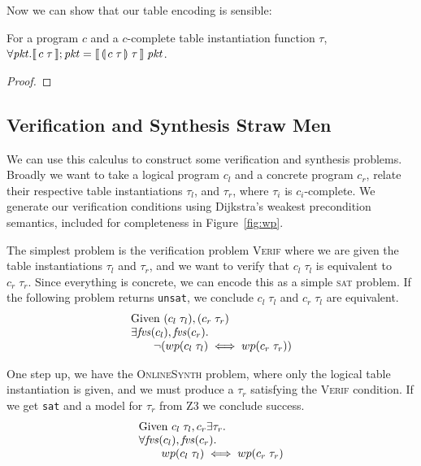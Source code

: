 Now we can show that our table encoding is sensible:

\begin{proposition}
  For a program $c$ and a $c$-complete table instantiation function $\tau$,
  $\forall \mathit{pkt}. \llbracket\,c\; \tau\,\rrbracket;\mathit{pkt} = \llbracket\,\llparenthesis\, c\; \tau\, \rrparenthesis\; \tau\,\rrbracket\; \mathit{pkt}$.
\end{proposition}

\begin{proof}
\end{proof}


\subsection{Verification and Synthesis Straw Men}

We can use this calculus to construct some verification and synthesis
problems. Broadly we want to take a logical program $c_l$ and a concrete program
$c_r$, relate their respective table instantiations $\tau_l$, and $\tau_r$,
where $\tau_i$ is $c_i$-complete.  We generate our verification conditions using
Dijkstra's weakest precondition semantics, included for completeness in
Figure~\ref{fig:wp}.

The simplest problem is the verification problem \textsc{Verif} where we are
given the table instantiations $\tau_l$ and $\tau_r$, and we want to verify that
$c_l\; \tau_l$ is equivalent to $c_r\; \tau_r$. Since everything is concrete, we
can encode this as a simple \textsc{sat} problem. If the following problem
returns \texttt{unsat}, we conclude $c_l\; \tau_l$ and $c_r\; \tau_l$ are
equivalent.
\[\begin{array}{lcl}
    \text{Given }( c_l\; \tau_l), (c_r\; \tau_r) \\
    \exists \mathit{fvs}(c_l), \mathit{fvs}(c_r). \\
    \qquad \neg(wp(c_l\; \tau_l) \iff wp(c_r\; \tau_r))
  \end{array}
\]

One step up, we have the \textsc{OnlineSynth} problem, where only the logical
table instantiation is given, and we must produce a $\tau_r$ satisfying the
\textsc{Verif} condition. If we get \texttt{sat} and a model for $\tau_r$ from
Z3 we conclude success.
\[\begin{array}{lcl}
    \text{Given } c_l\; \tau_l,c_r
    \exists \tau_r.\\
    \forall \mathit{fvs}(c_l), \mathit{fvs}(c_r). \\
    \qquad wp(c_l\; \tau_l) \iff wp(c_r\; \tau_r)
  \end{array}
\]

